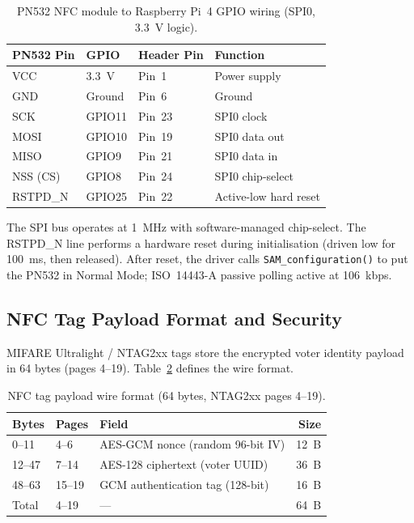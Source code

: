 \documentclass[submission]{sacjsub}
\begin{document}
\begin{table}[t]
\caption{PN532 NFC module to Raspberry Pi~4 GPIO wiring
  (SPI0, 3.3~V logic).}
\label{tab:pn532_wiring}
\begin{tabular}{|l|l|l|l|}
  \hline
  PN532 Pin & GPIO & Header Pin & Function \\
  \hline
  VCC      & 3.3~V   & Pin~1  & Power supply \\
  GND      & Ground  & Pin~6  & Ground \\
  SCK      & GPIO11  & Pin~23 & SPI0 clock \\
  MOSI     & GPIO10  & Pin~19 & SPI0 data out \\
  MISO     & GPIO9   & Pin~21 & SPI0 data in \\
  NSS (CS) & GPIO8   & Pin~24 & SPI0 chip-select \\
  RSTPD\_N & GPIO25  & Pin~22 & Active-low hard reset \\
  \hline
\end{tabular}
\end{table}

The SPI bus operates at 1~MHz with software-managed chip-select.
The RSTPD\_N line performs a hardware reset during initialisation
(driven low for 100~ms, then released). After reset, the driver calls
\texttt{SAM\_configuration()} to put the PN532 in Normal Mode;
ISO~14443-A passive polling active at 106~kbps.

\subsection{NFC Tag Payload Format and Security}

MIFARE Ultralight / NTAG2xx tags store the encrypted voter identity
payload in 64 bytes (pages 4--19). Table~\ref{tab:nfc_payload} defines
the wire format.

\begin{table}[t]
\caption{NFC tag payload wire format (64 bytes, NTAG2xx pages 4--19).}
\label{tab:nfc_payload}
\begin{tabular}{|l|l|l|r|}
  \hline
  Bytes & Pages & Field & Size \\
  \hline
  0--11   & 4--6    & AES-GCM nonce (random 96-bit IV) & 12~B \\
  12--47  & 7--14   & AES-128 ciphertext (voter UUID) & 36~B \\
  48--63  & 15--19  & GCM authentication tag (128-bit) & 16~B \\
  \hline
  Total   & 4--19   & --- & 64~B \\
  \hline
\end{tabular}
\end{table}
\end{document}
